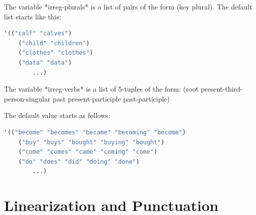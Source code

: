\documentclass[10pt,a4paper]{report}
\begin{document}
The variable *irreg-plurals* is a list of pairs of the form (key plural).
The default list starts like this: 

\begin{lstlisting}[language=Lisp]
   '(("calf" "calves")
	("child" "children")
	("clothes" "clothes")
	("data" "data")
        ...)
\end{lstlisting}

The variable *irreg-verbs* is a list of 5-tuples of the form:
(root present-third-person-singular past present-participle past-participle)

The default value starts as follows:

\begin{lstlisting}[language=Lisp]
  '(("become" "becomes" "became" "becoming" "become")
	("buy" "buys" "bought" "buying" "bought")
	("come" "comes" "came" "coming" "come")
	("do" "does" "did" "doing" "done")
        ...)
\end{lstlisting}


\section{Linearization and Punctuation}
\label{linearizer}
\end{document}
